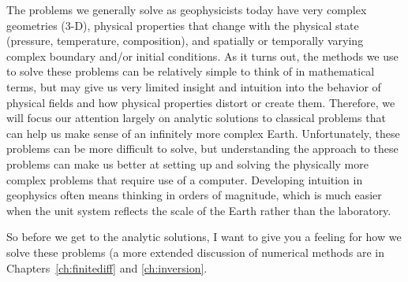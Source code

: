 The problems we generally solve as geophysicists today have very complex geometries (3-D), physical properties that change with the physical state (pressure, temperature, composition), and spatially or temporally varying complex boundary and/or initial conditions.  As it turns out, the methods we use to solve these problems can be relatively simple to think of in mathematical terms, but may give us very limited insight and intuition into the behavior of physical fields and how physical properties distort or create them.  Therefore, we will focus our attention largely on analytic solutions to classical problems that can help us make sense of an infinitely more complex Earth.  Unfortunately, these problems can be more difficult to solve, but understanding the approach to these problems can make us better at setting up and solving the physically more complex problems that require use of a computer.  Developing intuition in geophysics often means thinking in orders of magnitude, which is much easier when the unit system reflects the scale of the Earth rather than the laboratory.

So before we get to the analytic solutions, I want to give you a feeling for how we solve these problems (a more extended discussion of numerical methods are in Chapters~\ref{ch:finitediff} and \ref{ch:inversion}.


